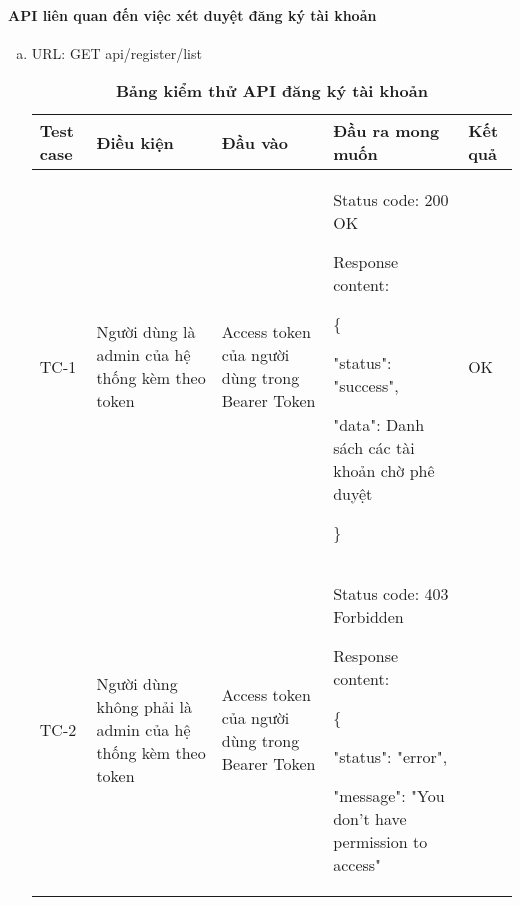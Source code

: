 \paragraph{API liên quan đến việc xét duyệt đăng ký tài khoản}
\mbox{}




\begin{enumerate}[a)]
  \item URL: GET api/register/list
  
\break

  \begin{xltabular}{\textwidth}{
    | >{\raggedright\arraybackslash}p{1cm}
    | >{\raggedright\arraybackslash}p{2.5cm}
    | >{\raggedright\arraybackslash}p{3.5cm}
    | >{\raggedright\arraybackslash}X
    | >{\raggedright\arraybackslash}p{1cm}|
    }
    \caption{\bfseries \fontsize{12pt}{0pt}\selectfont Bảng kiểm thử API đăng ký tài khoản}
    \\
    \hline
    \bfseries Test case    &\bfseries Điều kiện   &\bfseries Đầu vào 
    &\bfseries Đầu ra mong muốn &\bfseries Kết quả\\ \hline
  
  
    TC-1
    & Người dùng là admin của hệ thống kèm theo token
    & Access token của người dùng trong Bearer Token
  
    & 
  
    Status code: 200 OK
  
      Response content:
  
      \{
  
    "status": "success",
  
    "data": Danh sách các tài khoản chờ phê duyệt
  
    \}
    
    & OK
  
    \\ \hline
  
    TC-2
    & Người dùng không phải là admin của hệ thống kèm theo token
    & Access token của người dùng trong Bearer Token
  
    & 
  
    Status code: 403 Forbidden
  
      Response content:
  
      \{
  
    "status": "error",
  
    "message": "You don't have permission to access"
  

\end{xltabular}
\end{enumerate}

